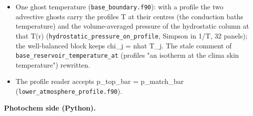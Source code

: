 \documentclass[english,a4paper]{my_memo}
\begin{document}
\begin{itemize}
  \texttt{parameters.f90} \texttt{h\_atomic\_share\_base}, \texttt{composition.f90}
  \texttt{base\_h2\_nuclei\_fraction}): with a profile, x2 = 1 - q\_H n\_tot/n\_H, the
  nuclei per particle from the profile\textquotesingle s rho, n\_tot and X\_El (agrees with the
  sum over the q\_ columns to 2e-5 on the LHS profiles); the hydrogen of CH4,
  NH3, H2O goes onto H2. base.inp keeps 2q(1 + He/H)/(1 + q).
\item
  One ghost temperature (\texttt{base\_boundary.f90}): with a profile the two
  advective ghosts carry the profile\textquotesingle s T at their centres (the conduction
  bath\textquotesingle s temperature) and the volume-averaged pressure of the hydrostatic
  column at that T(r) (\texttt{hydrostatic\_pressure\_on\_profile}, Simpson in 1/T, 32
  panels); the well-balanced block keeps chi\_j = nhat T\_j. The stale comment
  of \texttt{base\_reservoir\_temperature\_at} (profiles "an isotherm at the clima skin
  temperature") rewritten.
\item
  The profile reader accepts p\_top\_bar = p\_match\_bar (\texttt{lower\_atmosphere\_profile.f90}).
\end{itemize}

\textbf{Photochem side (Python).}
\end{document}
